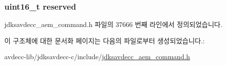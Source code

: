 \subsubsection[{\texorpdfstring{reserved}{reserved}}]{\setlength{\rightskip}{0pt plus 5cm}uint16\+\_\+t reserved}\hypertarget{structjdksavdecc__aem__command__auth__delete__key__from__chain_a5a6ed8c04a3db86066924b1a1bf4dad3}{}\label{structjdksavdecc__aem__command__auth__delete__key__from__chain_a5a6ed8c04a3db86066924b1a1bf4dad3}


jdksavdecc\+\_\+aem\+\_\+command.\+h 파일의 37666 번째 라인에서 정의되었습니다.



이 구조체에 대한 문서화 페이지는 다음의 파일로부터 생성되었습니다.\+:\begin{DoxyCompactItemize}
\item 
avdecc-\/lib/jdksavdecc-\/c/include/\hyperlink{jdksavdecc__aem__command_8h}{jdksavdecc\+\_\+aem\+\_\+command.\+h}\end{DoxyCompactItemize}
